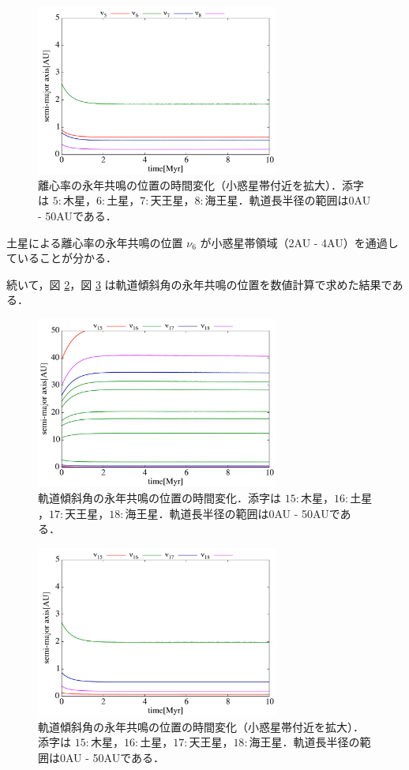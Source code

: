 \documentclass[11pt,a4paper,oneside,onecolumn]{jreport}
\begin{document}
\begin{figure}[H]
\centering
\includegraphics[width=8cm]{./image/SecularResonanceAxis_ecc_upto5AU.pdf}
\caption{離心率の永年共鳴の位置の時間変化（小惑星帯付近を拡大）．添字は $5 : 木星$，$6 : 土星$，$7 : 天王星$，$8 : 海王星$．軌道長半径の範囲は0AU - 50AUである．\label{fig:SecularResonanceAxis_ecc_upto5AU}}
\end{figure}

土星による離心率の永年共鳴の位置 $\nu_6$ が小惑星帯領域（2AU - 4AU）を通過していることが分かる．

続いて，図 \ref{fig:SecularResonanceAxis_inc}，図 \ref{fig:SecularResonanceAxis_inc_upto5AU} は軌道傾斜角の永年共鳴の位置を数値計算で求めた結果である．

\begin{figure}[H]
\centering
\includegraphics[width=8cm]{./image/SecularResonanceAxis_inc.pdf}
\caption{軌道傾斜角の永年共鳴の位置の時間変化．添字は $15 : 木星$，$16 : 土星$，$17 : 天王星$，$18 : 海王星$．軌道長半径の範囲は0AU - 50AUである．\label{fig:SecularResonanceAxis_inc}}
\end{figure}

\begin{figure}[H]
\centering
\includegraphics[width=8cm]{./image/SecularResonanceAxis_inc_upto5AU.pdf}
\caption{軌道傾斜角の永年共鳴の位置の時間変化（小惑星帯付近を拡大）．添字は $15 : 木星$，$16 : 土星$，$17 : 天王星$，$18 : 海王星$．軌道長半径の範囲は0AU - 50AUである．\label{fig:SecularResonanceAxis_inc_upto5AU}}
\end{figure}
\end{document}

